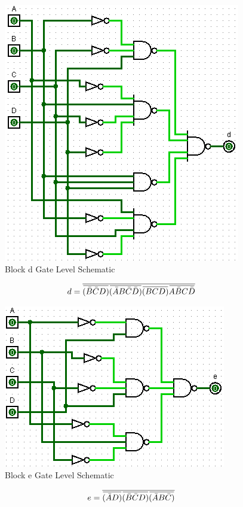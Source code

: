 \documentclass[12pt]{article}
\newcommand{\overbar}[1]{\mkern 1.5mu\overline{\mkern-1.5mu#1\mkern-1.5mu}\mkern 1.5mu} %
\begin{document}
\begin{figure}[h]
	\centering
	\label{fig:dBlockGates}
	\includegraphics[width=0.65\linewidth, keepaspectratio]{d_logicCkt}
	\caption{Block d Gate Level Schematic}
\end{figure}

\begin{equation}
	d = \overline{\overbar{(\bar{B}\bar{C}D)}\overbar{(\bar{A}B\bar{C}\bar{D})}\overbar{(BCD)}\overbar{A\bar{B}C\bar{D}}}
\end{equation}

\begin{figure}[h]
	\centering
	\label{fig:eBlockGates}
	\includegraphics[width=0.65\linewidth, keepaspectratio]{e_logicCkt}
	\caption{Block e Gate Level Schematic}
\end{figure}

\begin{equation}
	e = \overline{\overbar{(\bar{A}D)}\overbar{(\bar{B}\bar{C}D)}\overbar{(\bar{A}B\bar{C})}}
\end{equation}
\end{document}
